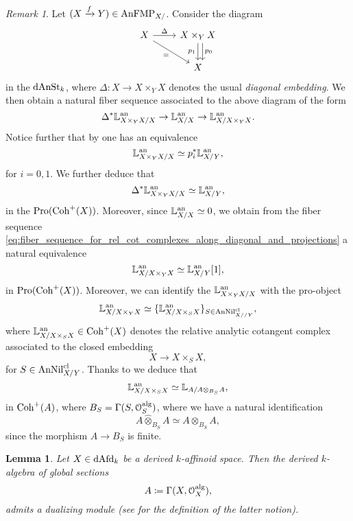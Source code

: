\documentclass[10pt,a4paper,reqno]{amsart} %
\theoremstyle{plain}
\newtheorem{lem}[thm]{Lemma}
\theoremstyle{definition}
\theoremstyle{remark}
\newtheorem{rem}[thm]{Remark}
\numberwithin{equation}{section}
\begin{document}
\begin{rem} Let $(X \xrightarrow{f} Y) \in \mathrm{AnFMP}_{X/ }$.
Consider the diagram
    \[
    \begin{tikzcd}
        X \ar{r}{\Delta}  \ar{rd}[swap]{=} & X \times_Y X \arrow[d, "p_0", shift left=2] \arrow{d}[swap]{p_1} \\
        &   X  
    \end{tikzcd}
    \]
in the \infcat $\mathrm{dAnSt}_k$, where $\Delta \colon X \to X \times_Y X$ denotes the usual \emph{diagonal embedding}. We then obtain a natural
fiber sequence associated to the above diagram of the form
    \begin{equation} \label{eq:fiber_sequence_for_rel_cot_complexes_along_diagonal_and_projections}
        \Delta^* \mathbb L^\mathrm{an}_{X \times_Y X/ X} \to \mathbb L^\mathrm{an}_{X/X} \to \mathbb L^\mathrm{an}_{X/ X \times_Y X}.
    \end{equation}
Notice further that by \cite[Proposition 5.12]{Porta_Yu_Representability} one has an equivalence
    \[
        \mathbb L^\mathrm{an}_{X \times_Y X/ X} \simeq p_i^* \mathbb L^\mathrm{an}_{X/Y},  
    \]
for $i =0, 1$. We further deduce that
    \[\Delta^* \mathbb L^\mathrm{an}_{X \times_Y X/ X} \simeq \mathbb L^\mathrm{an}_{X/Y},\]
in the \infcat $\mathrm{Pro}(\mathrm{Coh}^+(X))$. Moreover, since $\mathbb L^\mathrm{an}_{X/ X} \simeq 0$, we obtain from the fiber sequence \eqref{eq:fiber_sequence_for_rel_cot_complexes_along_diagonal_and_projections}
a natural equivalence
    \[
        \mathbb L^\mathrm{an}_{X/ X \times_Y X} \simeq \mathbb L^\mathrm{an}_{X / Y} [1],    
    \]
in $\mathrm{Pro}(\mathrm{Coh}^+(X))$. Moreover, we can identify the $\mathbb L^\mathrm{an}_{X \times_Y X / X}$ with the pro-object  
    \[
        \mathbb L^\mathrm{an}_{X/ X \times_Y X } \simeq \{ \mathbb L^\mathrm{an}_{X/ X \times_S X} \}_{S \in \mathrm{AnNil}_{X//Y}^{\mathrm{cl}}} ,
    \]
where $\mathbb L^\mathrm{an}_{X/ X\times_S X} \in \mathrm{Coh}^+(X)$ denotes the relative analytic cotangent complex associated to the closed embedding
    \[
        X \to X \times_S X,  
    \]
for $S \in \mathrm{AnNil}_{X/Y}^{\mathrm{cl}}$. Thanks to \cite[Corollary 5.33]{Porta_Yu_Representability} we deduce that
    \[
        \mathbb L^\mathrm{an}_{X/X\times_SX} \simeq \mathbb L_{A/ A \otimes_{B_S} A} ,
    \]
in $\mathrm{Coh}^+(A)$, where $B_S = \Gamma(S, \mathcal O^\mathrm{alg}_S)$, where we have a natural identification
    \[
        A \widehat{\otimes}_{B_S} A \simeq A \otimes_{B_S} A,
    \]
since the morphism $A \to B_S$ is finite.
\end{rem}

\begin{lem}
    Let $X \in \mathrm{dAfd}_k$ be a derived $k$-affinoid space. Then the derived $k$-algebra of global sections
        \[
            A \coloneqq \Gamma(X, \mathcal O_X^\mathrm{alg}),  
        \]
    admits a dualizing module (see \cite[Definition 4.2.5]{DAG-XIV} for the definition of the latter notion).
\end{lem}
\end{document}
